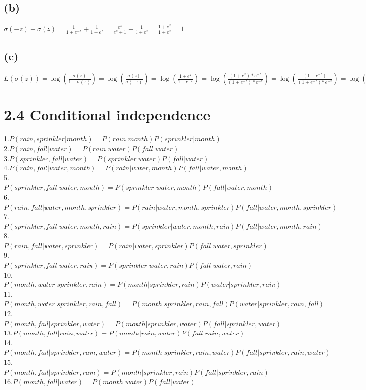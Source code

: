 \documentclass [11pt, a4paper, oneside] {article}
\begin{document}
\subsection *{(b)}
$\sigma(-z) + \sigma(z) = \frac{1}{1+e^{-z}} + \frac{1}{1+e^{z}} = \frac{e^z}{e^z+1} + \frac{1}{1+e^{z}} = \frac{1+e^{z}}{1+e^{z}} = 1$\\
\subsection *{(c)}
$L(\sigma(z)) = \log(\frac{\sigma(z)}{1-\sigma(z)}) = \log(\frac{\sigma(z)}{\sigma(-z)}) = \log(\frac{1+e^z}{1+e^{-z}}) = \log(\frac{(1+e^z)*e^{-z}}{(1+e^{-z})*e^{-z}}) = \log(\frac{(1+e^{-z})}{(1+e^{-z})*e^{-z}}) = \log(\frac{1}{e^{-z}})= \log(e^z) = z$
\section *{2.4 Conditional independence}
1.$P(rain, sprinkler|month) = P(rain|month)P(sprinkler|month)$\\
2.$P(rain, fall|water) = P(rain|water)P(fall|water)$\\
3.$P(sprinkler, fall|water) = P(sprinkler|water)P(fall|water)$\\
4.$P(rain, fall|water, month) = P(rain|water, month)P(fall|water, month)$\\
5.$P(sprinkler, fall|water, month) = P(sprinkler|water, month)P(fall|water, month)$\\
6.$P(rain, fall|water, month, sprinkler) = P(rain|water, month, sprinkler)P(fall|water, month, sprinkler)$\\
7.$P(sprinkler, fall|water, month, rain) = P(sprinkler|water, month, rain)P(fall|water, month, rain)$\\
8.$P(rain, fall|water, sprinkler) = P(rain|water, sprinkler)P(fall|water, sprinkler)$\\
9.$P(sprinkler, fall|water, rain) = P(sprinkler|water, rain)P(fall|water, rain)$\\
10.$P(month, water|sprinkler, rain) = P(month|sprinkler, rain)P(water|sprinkler, rain)$\\
11.$P(month, water|sprinkler, rain, fall) = P(month|sprinkler, rain, fall)P(water|sprinkler, rain, fall)$\\
12.$P(month, fall|sprinkler, water) = P(month|sprinkler, water)P(fall|sprinkler, water)$\\
13.$P(month, fall|rain, water) = P(month|rain, water)P(fall|rain, water)$\\
14.$P(month, fall|sprinkler, rain, water) = P(month|sprinkler, rain, water)P(fall|sprinkler, rain, water)$\\
15.$P(month, fall|sprinkler, rain) = P(month|sprinkler, rain)P(fall|sprinkler, rain)$\\
16.$P(month, fall|water) = P(month|water)P(fall|water)$\\
\end{document}
